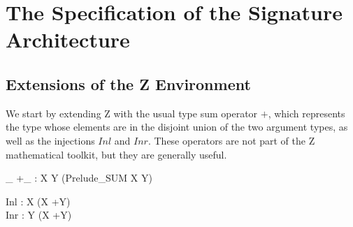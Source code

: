 \documentclass[a4paper,pdftex]{article}
\newcommand{\pplus}{+}
\begin{document}
\section{The Specification of the Signature Architecture} \label{DARMA-model}
\subsection{Extensions of the Z Environment}

We start by extending Z with the usual type sum operator $\pplus$, which
represents the type whose elements are in the disjoint union of the two
argument types, as well as the injections $Inl$ and $Inr$. These
operators are not part of the Z mathematical toolkit, but they are
generally useful.

    \begin{zed}
    \end{zed}

    \begin{gendef}[X,Y]
        \_ \pplus \_ : X \cross Y \fun \power (Prelude\_SUM \cross X
\cross Y)
    \end{gendef}
    \begin{gendef}[X,Y]
        Inl   : X \fun (X \pplus Y) \\
        Inr   : Y \fun (X \pplus Y) \\
    \end{gendef}
\end{document}
